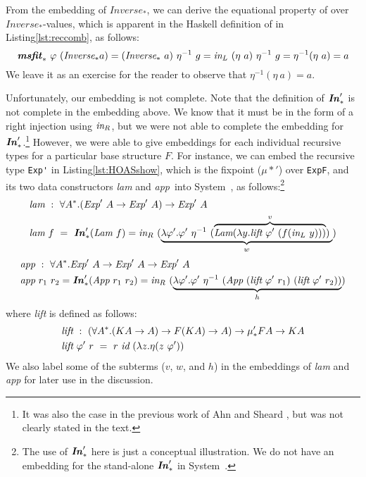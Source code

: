 From the embedding of $\textit{Inverse}_{*}$, we can derive the equational
property of \msfit{*} over $\textit{Inverse}_{*}$-values, which is apparent in
the Haskell definition of \msfit{*} in Listing\;\ref{lst:reccomb}, as follows:
\[
\textbf{\textit{msfit}}_{*}~\varphi~(\textit{Inverse}_{*} a) =
(\textit{Inverse}_{*}~a)~\eta^{-1}~g
= \textit{in}_{L}~(\eta~a)~\eta^{-1}~g = \eta^{-1}(\eta~a) = a
\]
We leave it as an exercise for the reader to observe that
$\eta^{-1}(\eta~a) = a$.

Unfortunately, our embedding is not complete. Note that the definition of
$\textbf{\textit{In}}_{*}'$ is not complete in the embedding above. We know that it must be
in the form of a right injection using $\textit{in}_{R}$, but we were not able to
complete the embedding for $\textbf{\textit{In}}_{*}'$.\footnote{
	It was also the case in the previous work of Ahn and Sheard
	\cite{AhnShe11}, but was not clearly stated in the text.}
However, we were able to give embeddings for each individual recursive types
for a particular base structure $F$. For instance, we can embed
the recursive type \lstinline{Exp'} in Listing\;\ref{lst:HOASshow},
which is the fixpoint ($\mu{*}'$) over \lstinline{ExpF}, and
its two data constructors \textit{lam} and \textit{app}\, into System~\Fw,
as follows:\footnote{The use of $\textbf{\textit{In}}_{*}'$ here is
	just a conceptual illustration. We do not have
	an embedding for the stand-alone $\textbf{\textit{In}}_{*}'$ in System~\Fw.}
\begin{align*}
\textit{lam}&~:~\forall A^{*}.
		(\textit{Exp}'~A \to \textit{Exp}'~A) \to \textit{Exp}'~A \\
\textit{lam}&~f~=~\textbf{\textit{In}}_{*}'(\textit{Lam}~f)
= \textit{in}_{R}~(\underbrace{
	\lambda \varphi'.\varphi'~\eta^{-1}~
	(\overbrace{\textit{Lam}(\lambda y.\textit{lift}~\varphi'~(f(\textit{in}_{L}~y))) }^v)\;
	}_w)
\end{align*}
\vspace*{-4ex}
\begin{align*}
\textit{app}&~:~\forall A^{*}.
		\textit{Exp}'~A \to \textit{Exp}'~A \to \textit{Exp}'~A \\
\textit{app}&~r_1~r_2 = \textbf{\textit{In}}_{*}'(\textit{App}~r_1~r_2)
= \textit{in}_{R}~(\underbrace{
		\lambda \varphi'.\varphi'~\eta^{-1}~
		(\textit{App}~(\textit{lift}~\varphi'~r_1)~(\textit{lift}~\varphi'~r_2))}_h)
\end{align*}
where \textit{lift} is defined as follows:
\begin{align*}
& \textit{lift}~:~(\forall A^{*}.(K A\to A)\to F(K A)\to A)\to \mu_{*}' F A\to K A\\
& \textit{lift}~\varphi'~r ~=~ r~\textit{id}~(\lambda z.\eta(z~\varphi'))
\end{align*}
We also label some of the subterms ($v$, $w$, and $h$)
in the embeddings of \textit{lam} and \textit{app} for
later use in the discussion.

